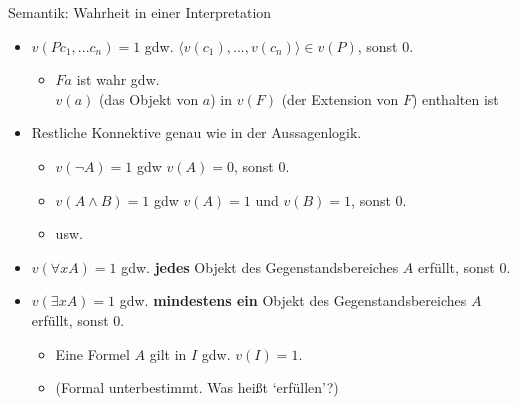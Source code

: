 \documentclass[12pt]{beamer}
\begin{document}
\begin{frame}{Semantik: Wahrheit in einer Interpretation}
  \begin{itemize}[<+->]
  \item $v(Pc_1,...c_n) = 1$ gdw.
    $\langle v(c_1),...,v(c_n)\rangle \in v(P)$, sonst 0.
    \begin{itemize}
    \item $Fa$ ist wahr gdw.\\ $v(a)$ (das Objekt von $a$) in $v(F)$
      (der Extension von $F$) enthalten ist
    \end{itemize}
  \item Restliche Konnektive genau wie in der Aussagenlogik.
    \begin{itemize}[<+->]
    \item $v(\neg A) = 1$ gdw $v(A) = 0$, sonst 0.
    \item $v(A \land B) = 1$ gdw $v(A) = 1$ und $v(B) = 1$, sonst 0.
    \item usw.
    \end{itemize}
  \end{itemize}

  \begin{itemize}[<+->]
    
  \item $v(\forall xA) = 1$ gdw. \textbf{jedes} Objekt des
    Gegenstandsbereiches $A$ erfüllt, sonst 0.
  \item $v(\exists xA) = 1$ gdw. \textbf{mindestens ein} Objekt des
    Gegenstandsbereiches $A$ erfüllt, sonst 0.
    \begin{itemize}
    \item Eine Formel $A$ gilt in $I$ gdw. $v(I) = 1$.
    \item (Formal unterbestimmt. Was heißt `erfüllen'?)
    \end{itemize}

  \end{itemize}

\end{frame}

\end{document}
